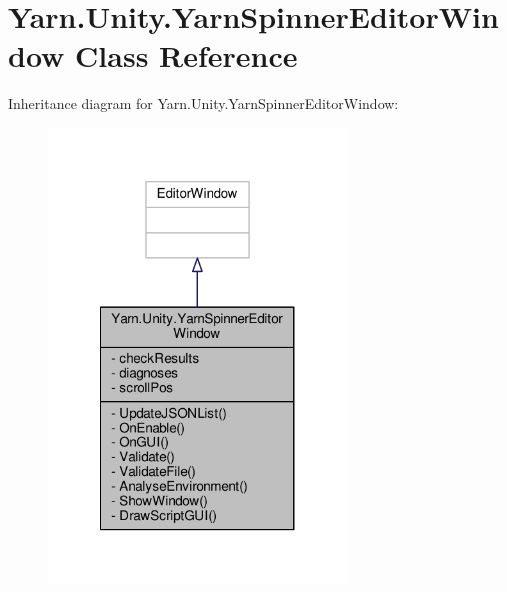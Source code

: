 \hypertarget{a00085}{\section{Yarn.\-Unity.\-Yarn\-Spinner\-Editor\-Window Class Reference}
\label{a00085}
}


Inheritance diagram for Yarn.\-Unity.\-Yarn\-Spinner\-Editor\-Window\-:
\nopagebreak
\begin{figure}[H]
\begin{center}
\leavevmode
\includegraphics[width=224pt]{d3/d93/a00341}
\end{center}
\end{figure}


